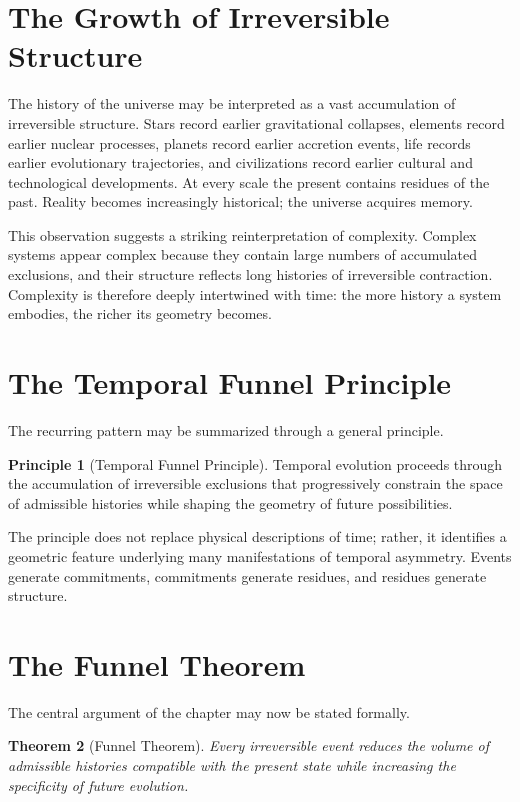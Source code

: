 \documentclass[11pt,oneside]{book}
\theoremstyle{plain}
\newtheorem{theorem}{Theorem}[chapter]
\theoremstyle{definition}
\newtheorem{principle}[theorem]{Principle}
\theoremstyle{remark}
\begin{document}
\section{The Growth of Irreversible Structure}

The history of the universe may be interpreted as a vast accumulation of irreversible structure. Stars record earlier gravitational collapses, elements record earlier nuclear processes, planets record earlier accretion events, life records earlier evolutionary trajectories, and civilizations record earlier cultural and technological developments. At every scale the present contains residues of the past. Reality becomes increasingly historical; the universe acquires memory.

This observation suggests a striking reinterpretation of complexity. Complex systems appear complex because they contain large numbers of accumulated exclusions, and their structure reflects long histories of irreversible contraction. Complexity is therefore deeply intertwined with time: the more history a system embodies, the richer its geometry becomes.

\section{The Temporal Funnel Principle}

The recurring pattern may be summarized through a general principle.

\begin{principle}[Temporal Funnel Principle]
Temporal evolution proceeds through the accumulation of irreversible exclusions that progressively constrain the space of admissible histories while shaping the geometry of future possibilities.
\end{principle}

The principle does not replace physical descriptions of time; rather, it identifies a geometric feature underlying many manifestations of temporal asymmetry. Events generate commitments, commitments generate residues, and residues generate structure.

\section{The Funnel Theorem}

The central argument of the chapter may now be stated formally.

\begin{theorem}[Funnel Theorem]
Every irreversible event reduces the volume of admissible histories compatible with the present state while increasing the specificity of future evolution.
\end{theorem}
\end{document}
